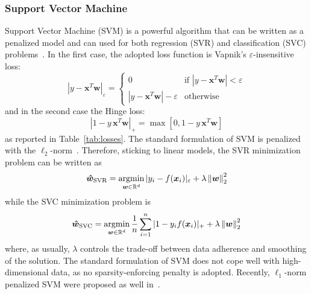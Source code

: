 			\subsubsection{Support Vector Machine}
			Support Vector Machine (\ac{SVM}) is a powerful algorithm that can be written as a penalized model and can used for both regression (\ac{SVR}) and classification (\ac{SVC}) problems~\cite{evgeniou2000regularization}. In the first case, the adopted loss function is Vapnik's $\varepsilon$-insensitive loss:
			\begin{equation} \label{eq:epsilon_insensitive}
				|y - \bm{x}^T\bm{w}|_\varepsilon =
   			\begin{cases}
					0 & \text{if } |y-\bm{x}^T\bm{w}| < \varepsilon\\
					|y-\bm{x}^T\bm{w}| - \varepsilon & \text{otherwise}
				\end{cases}
			\end{equation}
			and in the second case the Hinge loss:
			\begin{equation} \label{eq:hinge_loss}
				|1 - y\,\bm{x}^T\bm{w}|_+ = \max[0, 1 - y\,\bm{x}^T\bm{w}]
			\end{equation}
			as reported in Table~\ref{tab:losses}. The standard formulation of SVM is penalized with the $\ell_2$-norm~\cite{vapnik2013nature}.
			Therefore, sticking to linear models, the SVR minimization problem can be written as
			\begin{equation} \label{eq:svr}
				\bm{\hat w}_{\text{SVR}} = \mathop{\mathrm{argmin}}\limits_{\bm{w} \in \mathbb{R}^d} |y_i - f(\bm{x}_i)|_\varepsilon + \lambda \left\lVert\bm{w}\right\rVert_2^2
			\end{equation}
			while the SVC minimization problem is
			\begin{equation} \label{eq:svc}
				\bm{\hat w}_{\text{SVC}} = \mathop{\mathrm{argmin}}\limits_{\bm{w} \in \mathbb{R}^d} \frac{1}{n} \sum_{i=1}^n |1 - y_if(\bm{x}_i)|_+ + \lambda \left\lVert\bm{w}\right\rVert_2^2
			\end{equation}
			where, as usually, $\lambda$ controls the trade-off between data adherence and smoothing of the solution.
			The standard formulation of SVM does not cope well with high-dimensional data, as no sparsity-enforcing penalty is adopted. Recently, $\ell_1$-norm penalized SVM were proposed as well in~\cite{zhu20041, peng2016error}.









